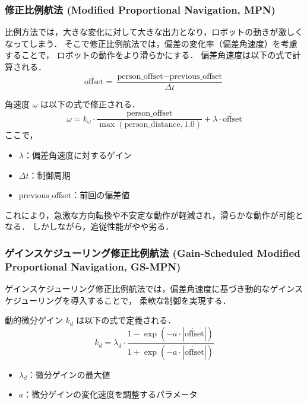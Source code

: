\subsubsection{修正比例航法 (Modified Proportional Navigation, MPN)}
比例方法では，大きな変化に対して大きな出力となり，ロボットの動きが激しくなってしまう．
そこで修正比例航法では，偏差の変化率（偏差角速度）を考慮することで，
ロボットの動作をより滑らかにする．
偏差角速度は以下の式で計算される．
\begin{equation}
    \dot{\text{offset}} = \frac{\text{person\_offset} - \text{previous\_offset}}{\Delta t}
\end{equation}

角速度 \(\omega\) は以下の式で修正される．
\begin{equation}
    \omega = k_\omega \cdot \frac{\text{person\_offset}}{\max(\text{person\_distance}, 1.0)} + \lambda \cdot \dot{\text{offset}}
\end{equation}
ここで，
\begin{itemize}
    \item \(\lambda\)：偏差角速度に対するゲイン
    \item \(\Delta t\)：制御周期
    \item \(\text{previous\_offset}\)：前回の偏差値
\end{itemize}

これにより，急激な方向転換や不安定な動作が軽減され，滑らかな動作が可能となる．
しかしながら，追従性能がやや劣る．

\subsubsection{ゲインスケジューリング修正比例航法
    (Gain-Scheduled Modified Proportional Navigation, GS-MPN)}
ゲインスケジューリング修正比例航法では，偏差角速度に基づき動的なゲインスケジューリングを導入することで，
柔軟な制御を実現する．

動的微分ゲイン \(k_d\) は以下の式で定義される．
\begin{equation}
    k_d = \lambda_d \cdot \frac{1 - \exp(-a \cdot |\dot{\text{offset}}|)}{1 + \exp(-a \cdot |\dot{\text{offset}}|)}
\end{equation}
\begin{itemize}
    \item \(\lambda_d\)：微分ゲインの最大値
    \item \(a\)：微分ゲインの変化速度を調整するパラメータ
\end{itemize}

